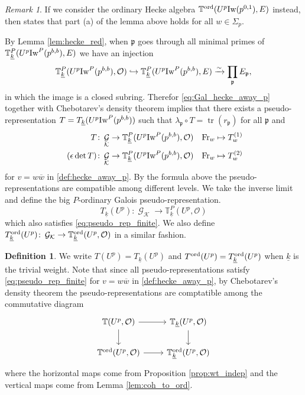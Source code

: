 \documentclass[leqno]{amsart}
\theoremstyle{definition}
\newtheorem{defn}[thm]{Definition}
\theoremstyle{remark}
\newtheorem{rem}[thm]{Remark}
\newcommand{\oo}{\mathcal{O}}
\DeclareMathOperator{\mtr}{tr}
\DeclareMathOperator{\Gal}{\mathcal{G}}
\newcommand{\Fr}{\textnormal{Fr}} %
\newcommand{\fp}{\mathfrak{p}}
\newcommand{\K}{{\mathcal{K}}} %
\newcommand{\bw}{{\overline{w}}}
\newcommand{\wt}[1]{\underline{ #1 }}
\newcommand{\Iw}{\textnormal{Iw}} %
\newcommand{\TT}{\mathbb{T}} %
\newcommand{\ord}{\textnormal{ord}} %
\begin{document}
\begin{rem}
If we consider the ordinary Hecke algebra
$\TT^{\ord}(U^p\Iw(p^{0,1}),E)$ instead,
then \cite[Cor 2.33]{ger} states that 
part (a) of the lemma above
holds for all $w\in\Sigma_p$.
\end{rem}

By Lemma \ref{lem:hecke_red},
when $\fp$ goes through all minimal primes
of $\TT^P_{\wt{k}}(U^p\Iw^P(p^{b,b}),E)$
we have an injection
\[
	\TT^P_{\wt{k}}(U^p\Iw^P(p^{b,b}),\oo)\hookrightarrow
	\TT^P_{\wt{k}}(U^p\Iw^P(p^{b,b}),E)\xrightarrow{\sim} 
	\prod_{\fp}E_{\fp},
\]
in which the image is a closed subring.
Therefor \eqref{eq:Gal_hecke_away_p}
together with Chebotarev's density theorem
implies that there exists
a pseudo-representation
$T=T_{\wt{k}}(U^p\Iw^P(p^{b,b}))$ 
such that $\lambda_\fp\circ T=\mtr(r_\fp)$ 
for all $\fp$ and
\begin{equation}\label{eq:pseudo_rep_finite}
\begin{aligned}
	T&\colon \Gal_{\K}
	\to \TT^P_{\wt{k}}(U^p\Iw^P(p^{b,b}),\oo)\quad
	\Fr_w\mapsto T_w^{(1)}\\\
	(\epsilon\det T)&\colon \Gal_{\K}
	\to \TT^P_{\wt{k}}(U^p\Iw^P(p^{b,b}),\oo)\quad
	\Fr_w\mapsto T_w^{(2)}
\end{aligned}
\end{equation}
for $v=w\bw$ in \eqref{def:hecke_away_p}.
By the formula above the pseudo-representations
are compatible among different levels.
We take the inverse limit and define
the big $P$-ordinary Galois pseudo-representation.
\[
T_{\wt{k}}(U^p)\colon \Gal_{\K} \to \TT^P_{\wt{k}}(U^p,\oo)
\]
which also satisfies \eqref{eq:pseudo_rep_finite}.
We also define 
$T_{\wt{k}}^{\ord}(U^p)\colon 
\Gal_{\K} \to \TT^{\ord}_{\wt{k}}(U^p,\oo)$
in a similar fashion.

\begin{defn}\label{def:big_Gal}
We write $T(U^p)=T_{\wt{k}}(U^p)$ and 
$T^{\ord}(U^p)=T_{\wt{k}}^{\ord}(U^p)$
when $\wt{k}$ is the trivial weight.
Note that since all pseudo-representations satisfy
\eqref{eq:pseudo_rep_finite}
for $v=w\bw$ in \eqref{def:hecke_away_p},
by Chebotarev's density theorem 
the pseudo-representations are comptatible among
the commutative diagram
\[
\begin{tikzcd}
    \TT(U^p,\oo) 
    \arrow[r] \arrow[d]&
    \TT_{\wt{k}}(U^p,\oo) 
    \arrow[d]\\
    \TT^{\ord}(U^p,\oo) 
    \arrow[r] &
    \TT^{\ord}_{\wt{k}}(U^p,\oo) 
\end{tikzcd}
\]
where the horizontal maps come from Proposition \ref{prop:wt_indep}
and the vertical maps come from Lemma \ref{lem:coh_to_ord}.
\end{defn}
\end{document}
